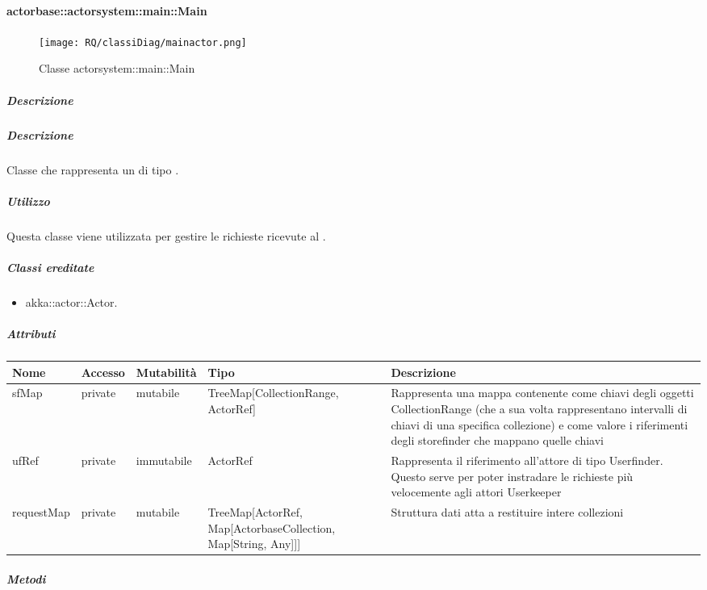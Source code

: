 \documentclass{scalatekids-article}
\begin{document}
\paragraph{actorbase::actorsystem::main::Main}
\label{sec:actorbase::actorsystem::main::Main}

\begin{figure}[H]
   \begin{center}
     \texttt{[image: RQ/classiDiag/mainactor.png]}
     \caption{Classe actorsystem::main::Main}
   \end{center}
 \end{figure}

\subparagraph{Descrizione}

\subparagraph{Descrizione}
Classe che rappresenta un  di tipo .

\subparagraph{Utilizzo}
Questa classe viene utilizzata per gestire le richieste ricevute al
.

\subparagraph{Classi ereditate}
\begin{itemize}
\item akka::actor::Actor.
\end{itemize}

\subparagraph{Attributi}
\begin{tabular}{| p{2.5cm} | p{1.5cm} | p{2cm} | p{4.2cm} | p{7cm} |}
  \hline
  Nome & Accesso & Mutabilità & Tipo & Descrizione\\
  \hline
  sfMap & private & mutabile & TreeMap[CollectionRange, ActorRef] & Rappresenta una mappa contenente come chiavi degli oggetti CollectionRange (che a sua volta rappresentano intervalli di chiavi di una specifica collezione) e come valore i riferimenti degli storefinder che mappano quelle chiavi \\
  \hline
  ufRef & private & immutabile & ActorRef & Rappresenta il riferimento all'attore di tipo Userfinder. Questo serve per poter instradare le richieste più velocemente agli attori Userkeeper \\
  \hline
  requestMap & private & mutabile & TreeMap[ActorRef, Map[ActorbaseCollection, Map[String, Any]]] & Struttura dati atta a restituire intere collezioni\\
  \hline
\end{tabular}

\subparagraph{Metodi}
\end{document}
